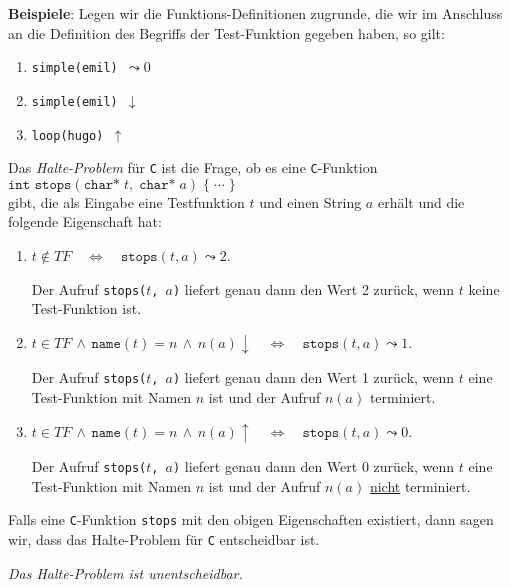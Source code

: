 \noindent
\textbf{Beispiele}: Legen wir die Funktions-Definitionen zugrunde, die wir im Anschluss an
die Definition des Begriffs der Test-Funktion gegeben haben, so gilt:
\begin{enumerate}
\item {\tt simple(emil) $\leadsto 0$}
\item {\tt simple(emil) $\downarrow$}
\item {\tt loop(hugo) $\uparrow$}
\end{enumerate}

\noindent
Das \emph{Halte-Problem} f\"ur \texttt{C} ist die Frage, ob es eine \texttt{C}-Funktion \\[0.1cm]
\hspace*{1.3cm} 
$\texttt{int stops}(\texttt{char*}\;t,\;\texttt{char*}\;a)\; \{\;\cdots\;\}$ \\[0.1cm]
gibt, die als Eingabe eine Testfunktion $t$ und einen String $a$ erh\"alt und die folgende
Eigenschaft hat:
\begin{enumerate}
\item $t \not\in T\!F \quad\Leftrightarrow\quad \mathtt{stops}(t, a) \leadsto 2$.

      Der Aufruf \texttt{stops($t$, $a$)} liefert genau dann den Wert 2 zur\"uck, 
      wenn $t$ keine Test-Funktion ist.

\item $t \in T\!F \,\wedge\, \mathtt{name}(t) = n \,\wedge\, n(a)\downarrow \quad\Leftrightarrow\quad
       \mathtt{stops}(t, a) \leadsto 1$.

      Der Aufruf \texttt{stops($t$, $a$)} liefert genau dann den Wert 1 zur\"uck,
      wenn $t$ eine Test-Funktion mit Namen $n$ ist und der Aufruf $n(a)$ terminiert.

\item $t \in T\!F \,\wedge\, \mathtt{name}(t) = n \,\wedge\, n(a)\uparrow \quad\Leftrightarrow\quad
       \mathtt{stops}(t, a) \leadsto 0$.

      Der Aufruf \texttt{stops($t$, $a$)} liefert genau dann den Wert 0 zur\"uck,
      wenn $t$ eine Test-Funktion mit Namen $n$ ist und der Aufruf $n(a)$ \underline{nicht} terminiert.
\end{enumerate}
Falls eine \texttt{C}-Funktion \texttt{stops} mit den obigen Eigenschaften existiert, dann
sagen wir, dass das Halte-Problem f\"ur \texttt{C} entscheidbar ist.

\begin{Satz}[Turing, 1936]
{\em
  Das Halte-Problem ist unentscheidbar.
} 
\end{Satz}

